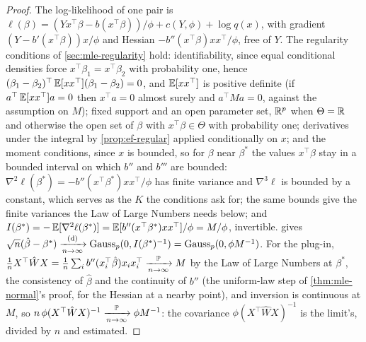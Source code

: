 \begin{proof}
The log-likelihood of one pair is $\ell(\beta) = (Y x^\top\beta - b(x^\top\beta))/\phi + c(Y, \phi) + \log q(x)$, with gradient $(Y - b'(x^\top\beta))x/\phi$ and Hessian $-b''(x^\top\beta)xx^\top/\phi$, free of $Y$.
The regularity conditions of \cref{sec:mle-regularity} hold: identifiability, since equal conditional densities force $x^\top\beta_1 = x^\top\beta_2$ with probability one, hence $(\beta_1 - \beta_2)^\top\operatorname*{\mathbb{E}}[xx^\top](\beta_1 - \beta_2) = 0$, and $\operatorname*{\mathbb{E}}[xx^\top]$ is positive definite (if $a^\top\operatorname*{\mathbb{E}}[xx^\top]a = 0$ then $x^\top a = 0$ almost surely and $a^\top Ma = 0$, against the assumption on $M$); fixed support and an open parameter set, $\mathbb{R}^p$ when $\Theta = \mathbb{R}$ and otherwise the open set of $\beta$ with $x^\top\beta \in \Theta$ with probability one; derivatives under the integral by \cref{prop:ef-regular} applied conditionally on $x$; and the moment conditions, since $x$ is bounded, so for $\beta$ near $\beta^*$ the values $x^\top\beta$ stay in a bounded interval on which $b''$ and $b'''$ are bounded: $\nabla^2\ell(\beta^*) = -b''(x^\top\beta^*)xx^\top/\phi$ has finite variance and $\nabla^3\ell$ is bounded by a constant, which serves as the $K$ the conditions ask for; the same bounds give the finite variances the Law of Large Numbers needs below; and $I(\beta^*) = -\operatorname*{\mathbb{E}}[\nabla^2\ell(\beta^*)] = \operatorname*{\mathbb{E}}[b''(x^\top\beta^*)xx^\top]/\phi = M/\phi$, invertible.
 gives $\sqrt{n}(\hat{\beta} - \beta^*) \xrightarrow [n \to \infty ]{\text{(d)}} \text{Gauss}_p(0, I(\beta^*)^{-1}) = \text{Gauss}_p(0, \phi M^{-1})$.
For the plug-in, $\frac1n X^\top\hat{W}X = \frac1n\sum_i b''(x_i^\top\hat{\beta})x_ix_i^\top \xrightarrow [n \to \infty ]{\mathbb{P}} M$ by the Law of Large Numbers at $\beta^*$, the consistency of $\hat{\beta}$ and the continuity of $b''$ (the uniform-law step of \cref{thm:mle-normal}'s proof, for the Hessian at a nearby point), and inversion is continuous at $M$, so $n\,\phi(X^\top\hat{W}X)^{-1} \xrightarrow [n \to \infty ]{\mathbb{P}} \phi M^{-1}$: the covariance $\phi(X^\top\hat{W}X)^{-1}$ is the limit's, divided by $n$ and estimated.
\end{proof}


